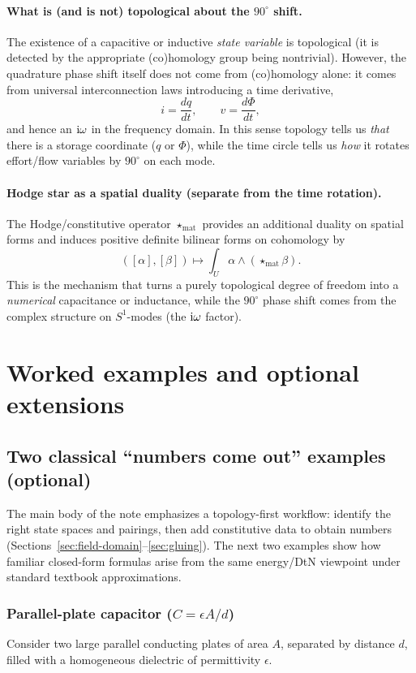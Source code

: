 \documentclass[11pt]{article}
\begin{document}
\paragraph{What is (and is not) topological about the $90^\circ$ shift.}
The existence of a capacitive or inductive \emph{state variable} is topological (it is detected by the appropriate (co)homology group being nontrivial).
However, the quadrature phase shift itself does not come from (co)homology alone: it comes from universal interconnection laws introducing a time derivative,
\[
i=\frac{dq}{dt},\qquad v=\frac{d\Phi}{dt},
\]
and hence an $\mathrm{i}\omega$ in the frequency domain.
In this sense topology tells us \emph{that} there is a storage coordinate ($q$ or $\Phi$), while the time circle tells us \emph{how} it rotates effort/flow variables by $90^\circ$ on each mode.

\paragraph{Hodge star as a spatial duality (separate from the time rotation).}
The Hodge/constitutive operator $\star_{\mathrm{mat}}$ provides an additional duality on spatial forms and induces positive definite bilinear forms on cohomology by
\[
([\alpha],[\beta])\longmapsto \int_U \alpha\wedge (\star_{\mathrm{mat}}\beta).
\]
This is the mechanism that turns a purely topological degree of freedom into a \emph{numerical} capacitance or inductance, while the $90^\circ$ phase shift comes from the complex structure on $S^1$-modes (the $\mathrm{i}\omega$ factor).

\section{Worked examples and optional extensions}
\label{sec:examples}

\subsection{Two classical ``numbers come out'' examples (optional)}
\label{sec:numerical-examples}
The main body of the note emphasizes a topology-first workflow: identify the right state spaces and pairings, then add constitutive data to obtain numbers (Sections~\ref{sec:field-domain}--\ref{sec:gluing}).
The next two examples show how familiar closed-form formulas arise from the same energy/DtN viewpoint under standard textbook approximations.

\subsubsection{Parallel-plate capacitor (\texorpdfstring{$C=\epsilon A/d$}{C = eps A/d})}
Consider two large parallel conducting plates of area $A$, separated by distance $d$, filled with a homogeneous dielectric of permittivity $\epsilon$.
\end{document}
